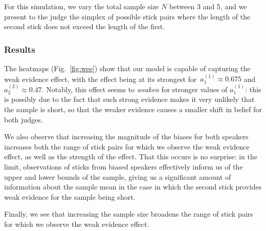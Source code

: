 \documentclass[10pt,letterpaper]{article}
\begin{document}
For this simulation, we vary the total sample size $N$ between 3 and 5, and we present to the judge the simplex of possible stick pairs 
where the length of the second stick does not exceed the length of the first.

\subsubsection{Results}
The heatmaps (Fig.~\ref{fig:wee}) show that our model is capable of capturing the weak evidence effect, with the effect being at its 
strongest for~${a_1^{(1)} \approx 0.675}$ and~${a_2^{(2)} \approx 0.47}$. Notably, this effect seems to \textit{weaken} for
stronger values of $a_1^{(1)}$: this is possibly due to the fact that such strong evidence makes it very unlikely that
the sample is short, so that the weaker evidence causes a smaller shift in belief for both judges.

We also observe that increasing the magnitude of the biases for both speakers increases both the range 
of stick pairs for which we observe the weak evidence effect, as well as the strength of the effect. That this occurs is
no surprise: in the limit, observations of sticks from biased speakers effectively inform us of the upper and lower bounds
of the sample, giving us a significant amount of information about the sample mean in the case in which the second stick
provides weak evidence for the sample being short.

Finally, we see that increasing the sample size broadens the range of stick pairs for which we observe the weak evidence
effect.
\end{document}
